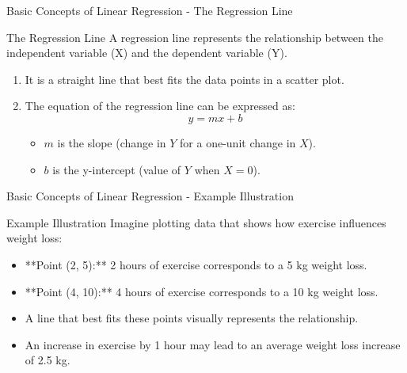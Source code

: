 \documentclass[aspectratio=169]{beamer}
\begin{document}
\begin{frame}[fragile]{Basic Concepts of Linear Regression - The Regression Line}
    \begin{block}{The Regression Line}
        A regression line represents the relationship between the independent variable (X) and the dependent variable (Y).
        \begin{enumerate}
            \item It is a straight line that best fits the data points in a scatter plot.
            \item The equation of the regression line can be expressed as:
            \begin{equation}
                y = mx + b
            \end{equation}
            \begin{itemize}
                \item \( m \) is the slope (change in \( Y \) for a one-unit change in \( X \)).
                \item \( b \) is the y-intercept (value of \( Y \) when \( X = 0 \)).
            \end{itemize}
        \end{enumerate}
    \end{block}
\end{frame}

\begin{frame}[fragile]{Basic Concepts of Linear Regression - Example Illustration}
    \begin{block}{Example Illustration}
        Imagine plotting data that shows how exercise influences weight loss:
        \begin{itemize}
            \item **Point (2, 5):** 2 hours of exercise corresponds to a 5 kg weight loss.
            \item **Point (4, 10):** 4 hours of exercise corresponds to a 10 kg weight loss.
        \end{itemize}
        \begin{itemize}
            \item A line that best fits these points visually represents the relationship.
            \item An increase in exercise by 1 hour may lead to an average weight loss increase of 2.5 kg.
        \end{itemize}
    \end{block}
\end{frame}
\end{document}
